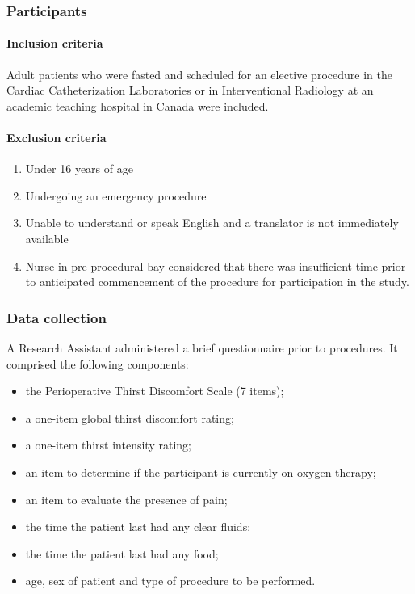 \documentclass[letterpaper,9pt,twocolumn,twoside,]{pinp}
\providecommand{\tightlist}{%
  \setlength{\itemsep}{0pt}\setlength{\parskip}{0pt}}
\begin{document}
\hypertarget{participants}{%
\subsubsection{Participants}\label{participants}}

\hypertarget{inclusion-criteria}{%
\paragraph{Inclusion criteria}\label{inclusion-criteria}}

Adult patients who were fasted and scheduled for an elective procedure
in the Cardiac Catheterization Laboratories or in Interventional
Radiology at an academic teaching hospital in Canada were included.

\hypertarget{exclusion-criteria}{%
\paragraph{Exclusion criteria}\label{exclusion-criteria}}

\begin{enumerate}
\def\labelenumi{\arabic{enumi}.}
\tightlist
\item
  Under 16 years of age
\item
  Undergoing an emergency procedure
\item
  Unable to understand or speak English and a translator is not
  immediately available
\item
  Nurse in pre-procedural bay considered that there was insufficient
  time prior to anticipated commencement of the procedure for
  participation in the study.
\end{enumerate}

\hypertarget{data-collection}{%
\subsubsection{Data collection}\label{data-collection}}

A Research Assistant administered a brief questionnaire prior to
procedures. It comprised the following components:

\begin{itemize}
\tightlist
\item
  the Perioperative Thirst Discomfort Scale (7 items);
\item
  a one-item global thirst discomfort rating;
\item
  a one-item thirst intensity rating;
\item
  an item to determine if the participant is currently on oxygen
  therapy;
\item
  an item to evaluate the presence of pain;
\item
  the time the patient last had any clear fluids;
\item
  the time the patient last had any food;
\item
  age, sex of patient and type of procedure to be performed.
\end{itemize}
\end{document}
